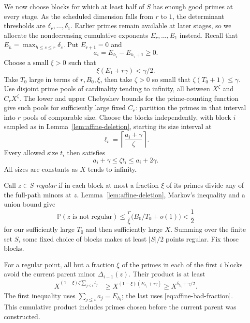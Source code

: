 We now choose blocks for which at least half of $S$ has enough good
primes at every stage. As the scheduled dimension falls from $r$ to
$1$, the determinant thresholds are $\delta_r,\ldots,\delta_1$.
Earlier primes remain available at later stages, so we allocate the
nondecreasing cumulative exponents
$E_r,\ldots,E_1$ instead. Recall that
$E_h=\max_{h\le s\le r}\delta_s$. Put $E_{r+1}=0$ and
\[
 a_i=E_{h_i}-E_{h_i+1}\ge0.
\]
Choose a small $\xi>0$ such that
\begin{equation}\label{eq:affine-bad-fraction}
 \xi(E_1+r\gamma)<\gamma/2.
\end{equation}
Take $T_0$ large in terms of $r,B_0,\xi$, then take $\zeta>0$ so small
that $\zeta(T_0+1)\le\gamma$.  Use disjoint prime pools of cardinality
tending to infinity, all between $X^\zeta$ and $C_rX^\zeta$.
The lower and upper Chebyshev bounds for the prime-counting function
give such pools for sufficiently large fixed $C_r$: partition the
primes in that interval into $r$ pools of comparable size.
Choose the blocks independently, with block $i$ sampled as in
Lemma~\ref{lem:affine-deletion}, starting its size interval at
\[
 \ell_i=\left\lceil\frac{a_i+\gamma}{\zeta}\right\rceil.
\]
Every allowed size $t_i$ then satisfies
\begin{equation}\label{eq:affine-block-sizes}
 a_i+\gamma\le\zeta t_i\le a_i+2\gamma.
\end{equation}
All sizes are constants as $X$ tends to infinity.

Call $z\in S$ \emph{regular} if in each block at most a fraction $\xi$
of its primes divide any of the full-path minors at $z$.
Lemma~\ref{lem:affine-deletion}, Markov's inequality and a union bound
give
\[
 \mathbb P(z\text{ is not regular})
 \le \frac r\xi\bigl(B_0/T_0+o(1)\bigr)<\frac12
\]
for our sufficiently large $T_0$ and then sufficiently large $X$.
Summing over the finite set $S$, some fixed choice of blocks makes at
least $|S|/2$ points regular.  Fix those blocks.

For a regular point, all but a fraction $\xi$ of the primes in each
of the first $i$ blocks avoid the current parent minor
$\Delta_{i-1}(z)$.  Their product is at least
\begin{align}
 X^{(1-\xi)\zeta\sum_{j\le i}t_j}
 &\ge X^{(1-\xi)(E_{h_i}+i\gamma)}
 \ge X^{\delta_{h_i}+\gamma/2}.
 \label{eq:affine-cumulative-product}
\end{align}
The first inequality uses
$\sum_{j\le i}a_j=E_{h_i}$; the last uses
\eqref{eq:affine-bad-fraction}.  This cumulative product includes
primes chosen before the current parent was constructed.


